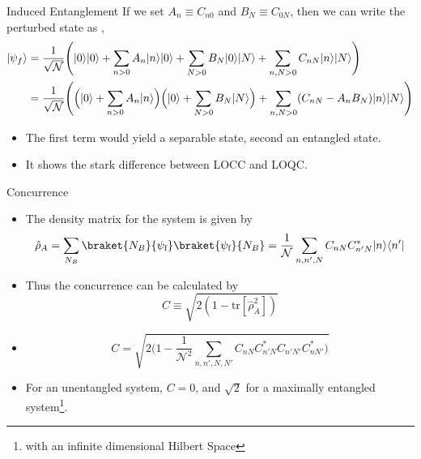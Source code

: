 \documentclass[12pt,aspectratio=1610]{beamer}
\DeclarePairedDelimiter\bra{\langle}{\rvert}
\DeclarePairedDelimiter\ket{\lvert}{\rangle}
\begin{document}
\begin{frame}{Induced Entanglement}
    If we set $A_n \equiv C_{n0}$ and $B_N \equiv C_{0N}$, then we can write the perturbed state as \citep{Bala_2012, Bose_2022},
\begin{equation*}
    \begin{aligned}
        \ket{\psi_f} &= \frac{1}{\sqrt{\mathcal{N}}} \Bigg(\ket{0}\ket{0} + \sum_{n>0} A_n \ket{n}\ket{0} + \sum_{N>0} B_N \ket{0}\ket{N} + \sum_{n, N > 0} C_{nN} \ket{n}\ket{N}\Bigg) \\
        &= \frac{1}{\sqrt{\mathcal{N}}} \Bigg( \Big(\ket{0} + \sum_{n>0} A_n \ket{n}\Big)\Big(\ket{0} + \sum_{N>0} B_N \ket{N}\Big) + \sum_{n, N > 0} (C_{nN} - A_nB_N) \ket{n}\ket{N} \Bigg)\\
    \end{aligned}
\end{equation*}
\begin{itemize}
    \item The first term would yield a separable state, second an entangled state.
    \item It shows the stark difference between LOCC and LOQC.
\end{itemize}
\end{frame}

\begin{frame}{Concurrence}
    \begin{itemize}
        \item The density matrix for the system is given by $$\hat{\rho}_{A}=\sum_{N_B}\braket{N_B}{\psi_{\text{f}}}\braket{\psi_{\text{f}}}{N_B} = \frac{1}{\mathcal{N}}\sum_{n,n',N}C_{nN}C_{n'N}^{*}\ket{n}\bra{n'}$$ \citep{Bose_2022}
        \item Thus the concurrence can be calculated by $$C\equiv\sqrt{2(1-\text{tr}[\hat{\rho}_{A}^{2}])}$$ \citep{PhysRevLett.78.5022, PhysRevA.64.042315}
        \item \begin{equation*}
    C = \sqrt{2\bigg(1 - \frac{1}{\mathcal{N}^2}\sum_{n,n',N,N'}C_{nN}C^{*}_{n'N} C_{n'N'}C^{*}_{nN'}\bigg)}
    \label{eq: Concurrence}
    \end{equation*}
        \item For an unentangled system, $C = 0$, and $\sqrt{2}$ for a maximally entangled system\footnote{with an infinite dimensional Hilbert Space}.
    \end{itemize}
\end{frame}
\end{document}
